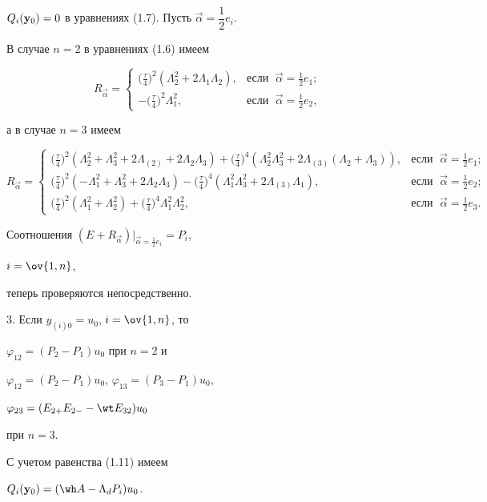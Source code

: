 \begin{pf}
$Q_i(\bold y_0)=0$ в уравнениях (1.7). Пусть $\Vec\alpha=\dfrac{1}{2}e_i$.


В случае $n=2$ в уравнениях (1.6) имеем


$$


R_{\Vec\alpha}=\begin{cases}


\big(\frac{\tau}{4}\big)^2(\Lambda_2^2+2\Lambda_1\Lambda_2),&


\text{если }\;\Vec\alpha=\frac{1}{2}e_1; \\


-\big(\frac{\tau}{4}\big)^2\Lambda_1^2,&


\text{если }\;\Vec\alpha=\frac{1}{2}e_2,


\end{cases}


$$


а в случае $n=3$ имеем


$$


R_{\Vec\alpha}=\begin{cases}


\big(\frac{\tau}{4}\big)^2(\Lambda_2^2+\Lambda_3^2+2\Lambda_{(2)}+


2\Lambda_2\Lambda_3)+\bigl(\frac{\tau}{4}\bigr)^4(\Lambda_2^2\Lambda_3^2+


2\Lambda_{(3)}(\Lambda_2+\Lambda_3)),&


\text{если }\;\Vec\alpha=\frac{1}{2}e_1; \\


\bigl(\frac{\tau}{4}\bigr)^2(-\Lambda_1^2+\Lambda_3^2+


2\Lambda_2\Lambda_3)-\bigl(\frac{\tau}{4}\bigr)^4(\Lambda_1^2\Lambda_3^2+


2\Lambda_{(3)}\Lambda_1),&


\text{если }\;\Vec\alpha=\frac{1}{2}e_2; \\


\bigl(\frac{\tau}{4}\bigr)^2(\Lambda_1^2+\Lambda_2^2)


+\bigl(\frac{\tau}{4}\bigr)^4\Lambda_1^2\Lambda_2^2,&


\text{если }\; \Vec\alpha=\frac{1}{2}e_3.


\end{cases}


$$


Соотношения $(E+R_{\Vec\alpha})\big|_{\Vec\alpha=\frac{1}{2}e_i}=P_i$, 


$i=\ov{1,n}$,


теперь проверяются непосредственно.





3. Если $y_{(i)0}=u_0$, $i=\ov{1,n}$, то 


$\varphi_{12}=(P_2-P_1)u_0$ при $n=2$ и 


$\varphi_{12}=(P_2-P_1)u_0$, $\varphi_{13}=(P_3-P_1)u_0$,


$\varphi_{23}=(E_{2+}E_{2-}-\wt E_{32})u_0$


при $n=3$.


С учетом равенства (1.11) имеем


$Q_i(\bold y_0)=(\wh A -\Lambda_d P_i)u_0$.


\end{pf}

